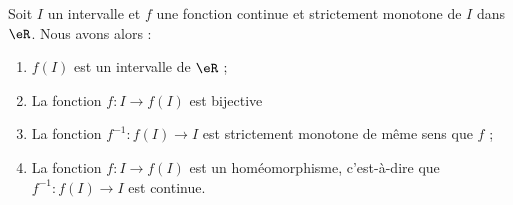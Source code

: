 \begin{theorem} \label{ThoKBRooQKXThd}
    Soit $I$ un intervalle et $f$ une fonction continue et strictement monotone de $I$ dans \( \eR\). Nous avons alors :
    \begin{enumerate}
        \item
            $f(I)$ est un intervalle de \( \eR\) ;
        \item       \label{ITEMooMAWXooZXmVwA}
            La fonction \( f\colon I\to f(I)\) est bijective
        \item
            La fonction \( f^{-1}\colon f(I)\to I\) est strictement monotone de même sens que $f$ ;
        \item \label{ItemEJZooKuFoeFiv}
            La fonction \( f\colon I\to f(I)\) est un homéomorphisme, c'est-à-dire que \( f^{-1}\colon f(I)\to I\) est continue.
    \end{enumerate}
\end{theorem}


